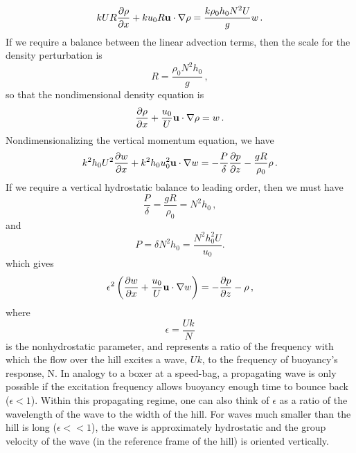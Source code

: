 \documentclass[12pt]{article}
\begin{document}
	\[
	k U R \frac{\partial{\rho}}{\partial{x}} + k u_0 R \mathbf{u}\cdot\nabla\rho = \frac{k \rho_0 h_0 N^2 U}{g} w\,.
	\]
	If we require a balance between the linear advection terms, then the scale for the density
	perturbation is 
	\[
	R = \frac{\rho_0 N^2 h_0}{g}\,,
	\]
	so that the nondimensional density equation is
	\[
	\frac{\partial{\rho}}{\partial{x}} + \frac{u_0}{U} \mathbf{u}\cdot\nabla\rho = w\,.
	\]
	Nondimensionalizing the vertical momentum equation, we have
	\[
	k^2 h_0 U^2 \frac{\partial{w}}{\partial{x}} + k^2 h_0 u_0^2\mathbf{u}\cdot\nabla w = -\frac{P}{\delta}\frac{\partial{p}}{\partial{z}} - \frac{g R}{\rho_0} \rho\,.
	\]
	If we require a vertical hydrostatic balance to leading order, then we must have 
	\[
	\frac{P}{\delta} = \frac{g R}{\rho_0} 
	= N^2 h_0\,,
	\]
	and
	\[
	P = \delta N^2h_0
	= \frac{N^2h_0^2U}{u_0}.
	\]
	which gives
	\[
	\epsilon^2 \left(\frac{\partial{w}}{\partial{x}} + \frac{u_0}{U}\mathbf{u}\cdot\nabla w\right) = -\frac{\partial{p}}{\partial{z}} - \rho\,,
	\]
	where 
	\[
	\epsilon = \frac{Uk}{N}
	\]
	is the nonhydrostatic parameter, and represents a ratio of the frequency with which the flow over the hill excites a wave, $Uk$, to the frequency of buoyancy's response, N. In analogy to a boxer at a speed-bag, a propagating wave is only possible if the excitation frequency allows buoyancy enough time to bounce back ($\epsilon<1$). Within this propagating regime, one can also think of $\epsilon$ as a ratio of the wavelength of the wave to the width of the hill. For waves much smaller than the hill is long ($\epsilon<<1$), the wave is approximately hydrostatic and the group velocity of the wave (in the reference frame of the hill) is oriented vertically. 
	
\end{document}
